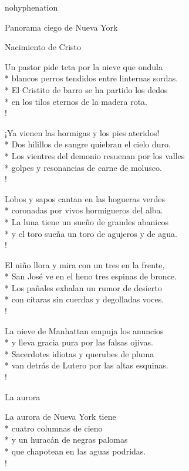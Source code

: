 \documentclass[
    a5paper,
    DIV=10,
    12pt,
    notitlepage,
    oneside,]
{scrbook} %
\begin{document}
\begin{hyphenrules}{nohyphenation}
\begin{poem}{Panorama ciego de Nueva York}{}{}
\end{poem}

\begin{poem}{Nacimiento de Cristo}{}{\vspace{-1em}}

Un pastor pide teta por la nieve que ondula\\*
blancos perros tendidos entre linternas sordas.\\*
El Cristito de barro se ha partido los dedos\\*
en los tilos eternos de la madera rota.\\!

¡Ya vienen las hormigas y los pies ateridos!\\*
Dos hilillos de sangre quiebran el cielo duro.\\*
Los vientres del demonio resuenan por los valles\\*
golpes y resonancias de carne de molusco.\\!

Lobos y sapos cantan en las hogueras verdes\\*
coronadas por vivos hormigueros del alba.\\*
La luna tiene un sueño de grandes abanicos\\*
y el toro sueña un toro de agujeros y de agua.\\!

El niño llora y mira con un tres en la frente,\\*
San José ve en el heno tres espinas de bronce.\\*
Los pañales exhalan un rumor de desierto\\*
con cítaras sin cuerdas y degolladas voces.\\!

La nieve de Manhattan empuja los anuncios\\*
y lleva gracia pura por las falsas ojivas.\\*
Sacerdotes idiotas y querubes de pluma\\*
van detrás de Lutero por las altas esquinas.\\!

\end{poem}

\begin{poem}{La aurora}{}{\vspace{-1em}}

La aurora de Nueva York tiene\\*
cuatro columnas de cieno\\*
y un huracán de negras palomas\\*
que chapotean en las aguas podridas.\\!


\end{poem}
\end{hyphenrules}
\end{document}
